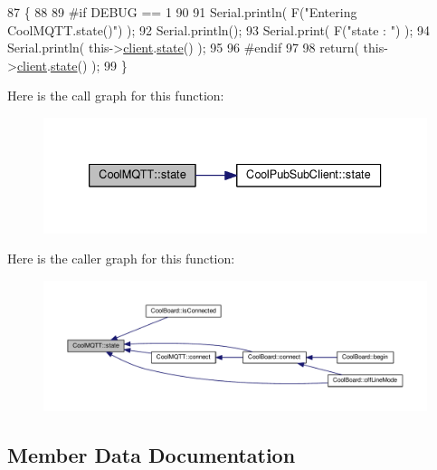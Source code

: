 \begin{DoxyCode}
87 \{
88 
89 \textcolor{preprocessor}{#if DEBUG == 1 }
90 
91     Serial.println( F(\textcolor{stringliteral}{"Entering CoolMQTT.state()"}) );
92     Serial.println();   
93     Serial.print( F(\textcolor{stringliteral}{"state : "}) );
94     Serial.println( this->\hyperlink{class_cool_m_q_t_t_afed1372683c44893b4668d0f1771f514}{client}.\hyperlink{class_cool_pub_sub_client_a3245a5afc6d22e61270dcfe392ccb866}{state}() );
95 
96 \textcolor{preprocessor}{#endif}
97     
98     \textcolor{keywordflow}{return}( this->\hyperlink{class_cool_m_q_t_t_afed1372683c44893b4668d0f1771f514}{client}.\hyperlink{class_cool_pub_sub_client_a3245a5afc6d22e61270dcfe392ccb866}{state}() );
99 \}
\end{DoxyCode}
Here is the call graph for this function\+:\nopagebreak
\begin{figure}[H]
\begin{center}
\leavevmode
\includegraphics[width=333pt]{d0/dd0/class_cool_m_q_t_t_a5d003307eff78efbd585e42b43b72b6d_cgraph}
\end{center}
\end{figure}
Here is the caller graph for this function\+:\nopagebreak
\begin{figure}[H]
\begin{center}
\leavevmode
\includegraphics[width=350pt]{d0/dd0/class_cool_m_q_t_t_a5d003307eff78efbd585e42b43b72b6d_icgraph}
\end{center}
\end{figure}


\subsection{Member Data Documentation}
\mbox{\label{class_cool_m_q_t_t_a7f3cf26b51d6770f216e42c5ef13ca9f}} 
